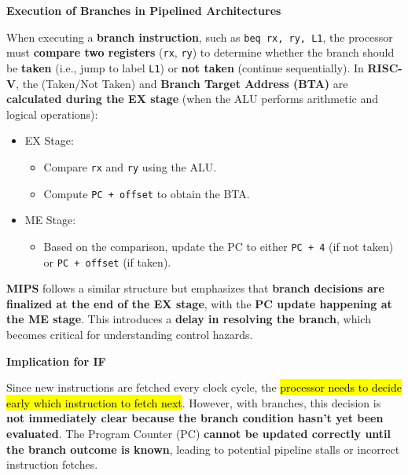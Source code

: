 \highspace
\begin{flushleft}
    \textcolor{Green3}{ \textbf{Execution of Branches in Pipelined Architectures}}
\end{flushleft}
When executing a \textbf{branch instruction}, such as \texttt{beq rx, ry, L1}, the processor must \textbf{compare two registers} (\texttt{rx}, \texttt{ry}) to determine whether the branch should be \textbf{taken} (i.e., jump to label \texttt{L1}) or \textbf{not taken} (continue sequentially). In \textbf{RISC-V}, the  (Taken/Not Taken) and \textbf{Branch Target Address (BTA)} are \textbf{calculated during the EX stage} (when the ALU performs arithmetic and logical operations):
\begin{itemize}
    \item EX Stage:
    \begin{itemize}
        \item Compare \texttt{rx} and \texttt{ry} using the ALU.
        \item Compute \texttt{PC + offset} to obtain the BTA.
    \end{itemize}

    \item ME Stage:
    \begin{itemize}
        \item Based on the comparison, update the PC to either \texttt{PC + 4} (if not taken) or \texttt{PC + offset} (if taken).
    \end{itemize}
\end{itemize}

\highspace
\textbf{MIPS} follows a similar structure but emphasizes that \textbf{branch decisions are finalized at the end of the EX stage}, with the \textbf{PC update happening at the ME stage}. This introduces a \textbf{delay in resolving the branch}, which becomes critical for understanding control hazards.

\highspace
\begin{flushleft}
    \textcolor{Red2}{ \textbf{Implication for IF}}
\end{flushleft}
Since new instructions are fetched every clock cycle, the \hl{processor needs to decide early which instruction to fetch next}. However, with branches, this decision is \textbf{not immediately clear because the branch condition hasn't yet been evaluated}. The Program Counter (PC) \textbf{cannot be updated correctly until the branch outcome is known}, leading to potential pipeline stalls or incorrect instruction fetches.
